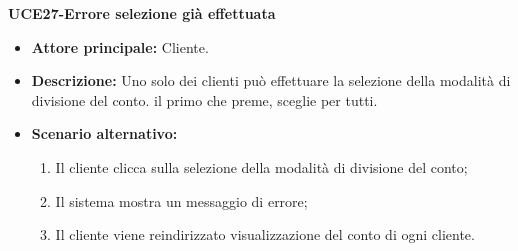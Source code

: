 \textbf{UCE27-Errore selezione già effettuata}
\begin{itemize}
\item \textbf{Attore principale:} Cliente.
\item \textbf{Descrizione:} Uno solo dei clienti può effettuare la selezione della modalità di divisione del conto.
  il primo che preme, sceglie per tutti.
\item \textbf{Scenario alternativo:}
\begin{enumerate}
    \item Il cliente clicca sulla selezione della modalità di divisione del conto;
    \item Il sistema mostra un messaggio di errore;
    \item Il cliente viene reindirizzato visualizzazione del conto di ogni cliente.
\end{enumerate}
\end{itemize}

